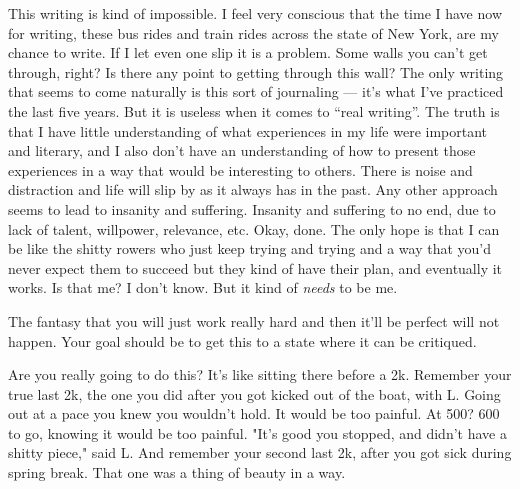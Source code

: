 \documentclass[12pt]{article}
\begin{document}
This writing is kind of impossible.  I feel very conscious that the time I have
now for writing, these bus rides and train rides across the state of New York,
are my chance to write.  If I let even one slip it is a problem.  Some walls you
can't get through, right?  Is there any point to getting through this wall?  The
only writing that seems to come naturally is this sort of journaling --- it's
what I've practiced the last five years.  But it is useless when it comes to
``real writing''.  The truth is that I have little understanding of what
experiences in my life were important and literary, and I also don't have an
understanding of how to present those experiences in a way that would be
interesting to others.  There is noise and distraction and life will slip by as
it always has in the past.  Any other approach seems to lead to insanity and
suffering.  Insanity and suffering to no end, due to lack of talent, willpower,
relevance, etc.  Okay, done.  The only hope is that I can be like the shitty
rowers who just keep trying and trying and a way that you'd never expect them to
succeed but they kind of have their plan, and eventually it works.  Is that me?
I don't know.  But it kind of \textit{needs} to be me.

The fantasy that you will just work really hard and then it'll be perfect will
not happen.  Your goal should be to get this to a state where it can be
critiqued.

Are you really going to do this?  It's like sitting there before a 2k.  Remember
your true last 2k, the one you did after you got kicked out of the boat, with
L.  Going out at a pace you knew you wouldn't hold.  It would be too
painful.  At 500?  600 to go, knowing it would be too painful.  "It's good you
stopped, and didn't have a shitty piece," said L.  And remember your second last
2k, after you got sick during spring break.  That one was a thing of beauty in a
way.  
\end{document}
